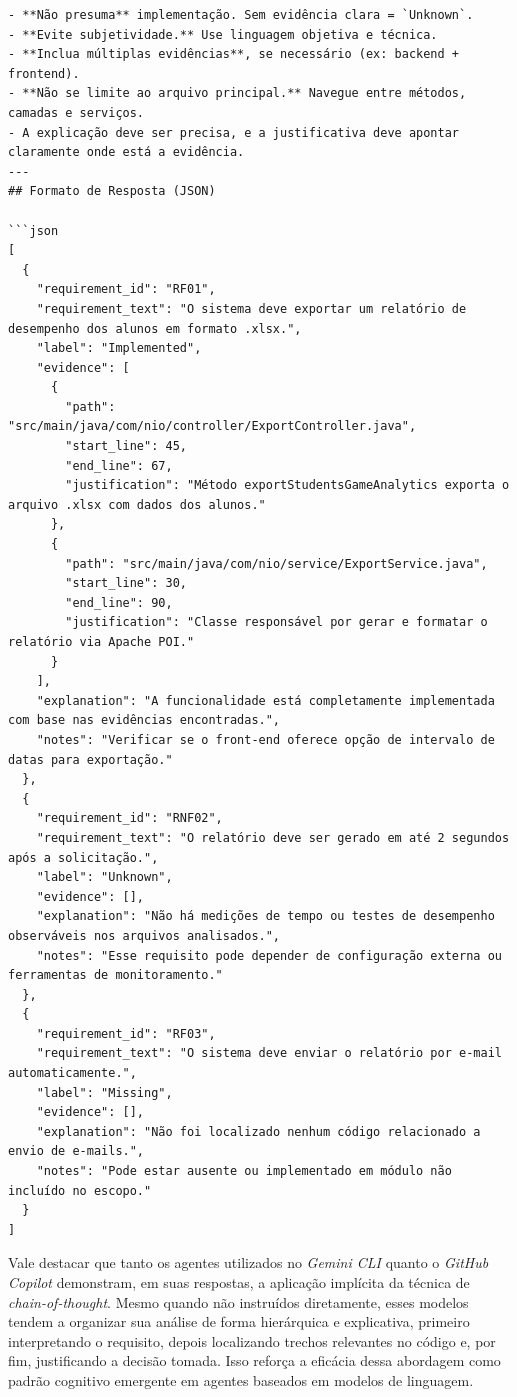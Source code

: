 \begin{verbatim}
- **Não presuma** implementação. Sem evidência clara = `Unknown`.
- **Evite subjetividade.** Use linguagem objetiva e técnica.
- **Inclua múltiplas evidências**, se necessário (ex: backend + frontend).
- **Não se limite ao arquivo principal.** Navegue entre métodos, camadas e serviços.
- A explicação deve ser precisa, e a justificativa deve apontar claramente onde está a evidência.
---
## Formato de Resposta (JSON)

```json
[
  {
    "requirement_id": "RF01",
    "requirement_text": "O sistema deve exportar um relatório de desempenho dos alunos em formato .xlsx.",
    "label": "Implemented",
    "evidence": [
      {
        "path": "src/main/java/com/nio/controller/ExportController.java",
        "start_line": 45,
        "end_line": 67,
        "justification": "Método exportStudentsGameAnalytics exporta o arquivo .xlsx com dados dos alunos."
      },
      {
        "path": "src/main/java/com/nio/service/ExportService.java",
        "start_line": 30,
        "end_line": 90,
        "justification": "Classe responsável por gerar e formatar o relatório via Apache POI."
      }
    ],
    "explanation": "A funcionalidade está completamente implementada com base nas evidências encontradas.",
    "notes": "Verificar se o front-end oferece opção de intervalo de datas para exportação."
  },
  {
    "requirement_id": "RNF02",
    "requirement_text": "O relatório deve ser gerado em até 2 segundos após a solicitação.",
    "label": "Unknown",
    "evidence": [],
    "explanation": "Não há medições de tempo ou testes de desempenho observáveis nos arquivos analisados.",
    "notes": "Esse requisito pode depender de configuração externa ou ferramentas de monitoramento."
  },
  {
    "requirement_id": "RF03",
    "requirement_text": "O sistema deve enviar o relatório por e-mail automaticamente.",
    "label": "Missing",
    "evidence": [],
    "explanation": "Não foi localizado nenhum código relacionado a envio de e-mails.",
    "notes": "Pode estar ausente ou implementado em módulo não incluído no escopo."
  }
]
\end{verbatim}
Vale destacar que tanto os agentes utilizados no \textit{Gemini CLI} quanto o \textit{GitHub Copilot} demonstram, em suas respostas, a aplicação implícita da técnica de \textit{chain-of-thought}. Mesmo quando não instruídos diretamente, esses modelos tendem a organizar sua análise de forma hierárquica e explicativa, primeiro interpretando o requisito, depois localizando trechos relevantes no código e, por fim, justificando a decisão tomada. Isso reforça a eficácia dessa abordagem como padrão cognitivo emergente em agentes baseados em modelos de linguagem.

